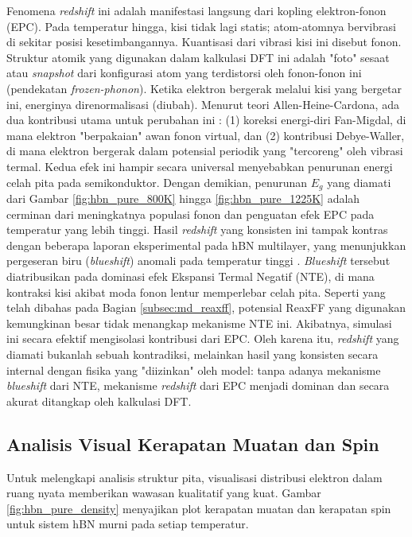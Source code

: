 Fenomena \emph{redshift} ini adalah manifestasi langsung dari kopling elektron-fonon (EPC).
Pada temperatur hingga, kisi tidak lagi statis; atom-atomnya bervibrasi di sekitar posisi kesetimbangannya. Kuantisasi dari vibrasi kisi ini disebut fonon.
Struktur atomik yang digunakan dalam kalkulasi DFT ini adalah "foto" sesaat atau \emph{snapshot} dari konfigurasi atom yang terdistorsi oleh fonon-fonon ini (pendekatan \emph{frozen-phonon}).
Ketika elektron bergerak melalui kisi yang bergetar ini, energinya direnormalisasi (diubah).
Menurut teori Allen-Heine-Cardona, ada dua kontribusi utama untuk perubahan ini \cite{Allen1983}: (1) koreksi energi-diri Fan-Migdal, di mana elektron "berpakaian" awan fonon virtual, dan (2) kontribusi Debye-Waller, di mana elektron bergerak dalam potensial periodik yang "tercoreng" oleh vibrasi termal.
Kedua efek ini hampir secara universal menyebabkan penurunan energi celah pita pada semikonduktor.
Dengan demikian, penurunan $E_g$ yang diamati dari Gambar \ref{fig:hbn_pure_800K} hingga \ref{fig:hbn_pure_1225K} adalah cerminan dari meningkatnya populasi fonon dan penguatan efek EPC pada temperatur yang lebih tinggi.
Hasil \emph{redshift} yang konsisten ini tampak kontras dengan beberapa laporan eksperimental pada hBN multilayer, yang menunjukkan pergeseran biru (\emph{blueshift}) anomali pada temperatur tinggi \cite{Du2017}.
\emph{Blueshift} tersebut diatribusikan pada dominasi efek Ekspansi Termal Negatif (NTE), di mana kontraksi kisi akibat moda fonon lentur memperlebar celah pita.
Seperti yang telah dibahas pada Bagian \ref{subsec:md_reaxff}, potensial ReaxFF yang digunakan kemungkinan besar tidak menangkap mekanisme NTE ini.
Akibatnya, simulasi ini secara efektif mengisolasi kontribusi dari EPC. Oleh karena itu, \emph{redshift} yang diamati bukanlah sebuah kontradiksi, melainkan hasil yang konsisten secara internal dengan fisika yang "diizinkan" oleh model: tanpa adanya mekanisme \emph{blueshift} dari NTE, mekanisme \emph{redshift} dari EPC menjadi dominan dan secara akurat ditangkap oleh kalkulasi DFT.

\subsection{Analisis Visual Kerapatan Muatan dan Spin}
\label{subsec:hbn_pure_density_analysis}
Untuk melengkapi analisis struktur pita, visualisasi distribusi elektron dalam ruang nyata memberikan wawasan kualitatif yang kuat.
Gambar \ref{fig:hbn_pure_density} menyajikan plot kerapatan muatan dan kerapatan spin untuk sistem hBN murni pada setiap temperatur.

